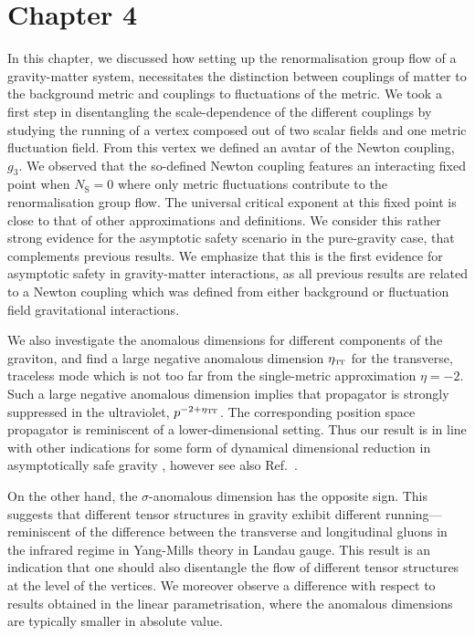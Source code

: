 \documentclass[11pt]{book}
\newcommand\TTspace{ -1pt }
\newcommand\etaTT{ \eta_{\scriptscriptstyle{\mathrm{T\hspace{\TTspace}T}}} }
\newcommand\NS{ N_{\scriptscriptstyle{\mathrm{S}}} }
\numberwithin{equation}{chapter}
\begin{document}
\section*{Chapter 4}

In this chapter, we discussed how setting up the renormalisation group flow of a gravity-matter system,
necessitates the distinction between couplings of matter to the background metric
and couplings to fluctuations of the metric.
We took a first step in disentangling the scale-dependence of the different couplings by studying
the running of a vertex composed out of two scalar fields and one metric fluctuation field.
From this vertex we defined an avatar of the Newton coupling, $g_3$.
We observed that the so-defined Newton coupling features an interacting fixed point when $\NS=0$
where only metric fluctuations contribute to the renormalisation group flow.
The universal critical exponent at this fixed point is close to that of other approximations and definitions.
We consider this rather strong evidence for the asymptotic safety scenario  in the pure-gravity case,
that complements previous results.
We emphasize that this is the first evidence for asymptotic safety in gravity-matter interactions,
as all previous results are related to a Newton coupling which was defined from either background
or fluctuation field gravitational interactions.

We also investigate the anomalous dimensions for different components of the graviton,
and find a large negative anomalous dimension $\etaTT$ for the transverse, traceless mode
which is not too far from the single-metric approximation $\eta=-2$.
Such a large negative anomalous dimension implies that propagator is strongly suppressed in the ultraviolet,
$p^{-2+\etaTT}$.
The corresponding position space propagator is reminiscent of a lower-dimensional setting.
Thus our result is in line with other indications for some form of dynamical dimensional reduction
in asymptotically safe gravity
\cite{Lauscher:2001ya, Lauscher:2005qz, Reuter:2011ah, Rechenberger:2012pm, Calcagni:2013vsa},
however see also Ref.~\cite{DOdorico:2015jtl}.

On the other hand, the  $\sigma$-anomalous dimension has the opposite sign.
This suggests that different tensor structures in gravity exhibit different running---reminiscent
of the difference between the transverse and longitudinal gluons in the infrared regime
in Yang-Mills theory in Landau gauge.
This result is an indication that one should also disentangle the flow of different tensor structures
at the level of the vertices.
We moreover observe a difference with respect to results obtained in the linear parametrisation,
where the anomalous dimensions are typically smaller in absolute value.
\end{document}
